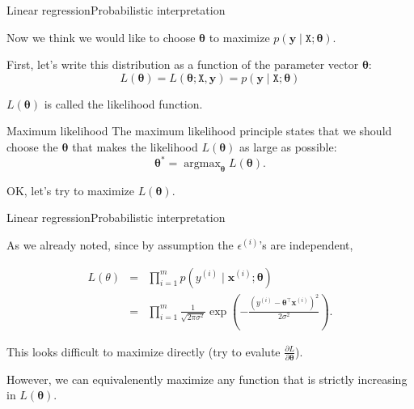 \documentclass{beamer}
\renewcommand{\vec}[1]{\boldsymbol{#1}}
\newcommand{\mat}[1]{\mathtt{#1}}
\DeclareMathOperator*{\argmax}{argmax}
\begin{document}
\begin{frame}{Linear regression}{Probabilistic interpretation}

  Now we think we would like to choose $\vec{\theta}$ to maximize
  $p(\vec{y} \mid \mat{X} ; \vec{\theta})$.

  \medskip

  First, let's write this distribution as a \alert{function} of the
  parameter vector $\vec{\theta}$:
  \[ L(\vec{\theta}) = L(\vec{\theta} ; \mat{X}, \vec{y}) = p(\vec{y} \mid \mat{X} ; \vec{\theta}) \]

  \medskip

  $L(\vec{\theta})$ is called the \alert{likelihood} function.

  \begin{block}{Maximum likelihood}
    The \alert{maximum likelihood} principle states that we should choose
    the $\vec{\theta}$ that makes the likelihood $L(\vec{\theta})$ as large
    as possible:
    \[ \vec{\theta}^* = \argmax_{\vec{\theta}} L(\vec{\theta}). \]
  \end{block}
  
  OK, let's try to maximize $L(\vec{\theta})$.
  
\end{frame}


\begin{frame}{Linear regression}{Probabilistic interpretation}

  As we already noted, since by assumption the $\epsilon^{(i)}$'s are
  independent,

  \begin{eqnarray}
    L(\theta) & = & \prod_{i=1}^m p(y^{(i)} \mid \vec{x}^{(i)} ; \vec{\theta}) \nonumber \\
    & = & \prod_{i=1}^m \frac{1}{\sqrt{2\pi\sigma^2}}\exp{\left( - \frac{(y^{(i)} - \vec{\theta}^\top \vec{x}^{(i)})^2}{2\sigma^2}\right)}. \nonumber
  \end{eqnarray}

  This looks difficult to maximize directly (try to evalute
  $\frac{\partial{L}}{\partial{\vec{\theta}}}$).

  \medskip

  However, we can equivalenently maximize \alert{any function that is
    strictly increasing} in $L(\vec{\theta})$.

\end{frame}
\end{document}
